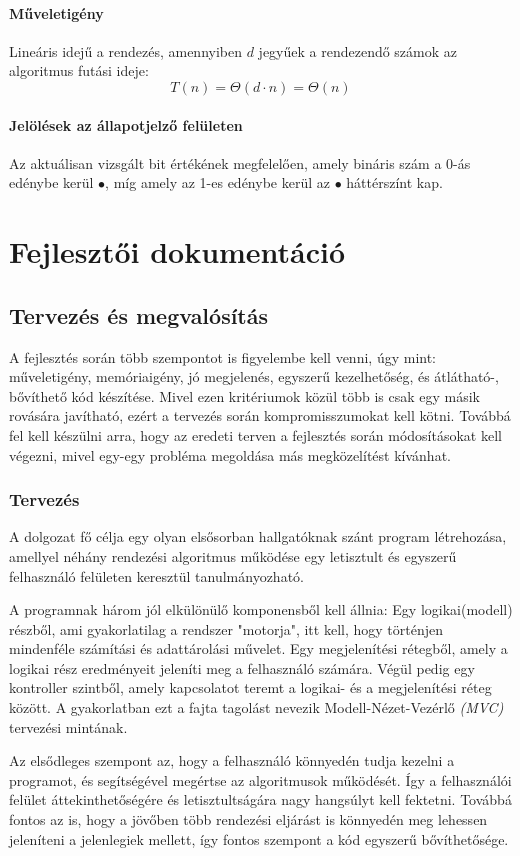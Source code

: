 \documentclass{elteikthesis}
\begin{document}
\subsubsection{Műveletigény}
Lineáris idejű a rendezés, amennyiben $d$ jegyűek a rendezendő számok az algoritmus futási ideje:
$$T(n)=\Theta(d \cdot n) = \Theta(n)$$
\subsubsection{Jelölések az állapotjelző felületen}
Az aktuálisan vizsgált bit értékének megfelelően, amely bináris szám a 0-ás edénybe kerül \textcolor{swap}{\Huge$\bullet$}, míg amely az 1-es edénybe kerül az \textcolor{select}{\Huge$\bullet$} háttérszínt kap.

\chapter{Fejlesztői dokumentáció}

\section{Tervezés és megvalósítás}
A fejlesztés során több szempontot is figyelembe kell venni, úgy mint: műveletigény, memóriaigény, jó megjelenés, egyszerű kezelhetőség, és átlátható-, bővíthető kód készítése. Mivel ezen kritériumok közül több is csak egy másik rovására javítható, ezért a tervezés során kompromisszumokat kell kötni. Továbbá fel kell készülni arra, hogy az eredeti terven a fejlesztés során módosításokat kell végezni, mivel egy-egy probléma megoldása más megközelítést kívánhat.

\subsection{Tervezés}
A dolgozat fő célja egy olyan elsősorban hallgatóknak szánt program létrehozása, amellyel néhány rendezési algoritmus működése egy letisztult és egyszerű felhasználó felületen keresztül tanulmányozható.\par
A programnak három jól elkülönülő komponensből kell állnia:
Egy logikai(modell) részből, ami gyakorlatilag a rendszer "motorja", itt kell, hogy történjen mindenféle számítási és adattárolási művelet. Egy megjelenítési rétegből, amely a logikai rész eredményeit jeleníti meg a felhasználó számára. Végül pedig egy kontroller szintből, amely kapcsolatot teremt a logikai- és a megjelenítési réteg között. A gyakorlatban ezt a fajta tagolást nevezik Modell-Nézet-Vezérlő \emph{(MVC)} tervezési mintának.\par
Az elsődleges szempont az, hogy a felhasználó könnyedén tudja kezelni a programot, és segítségével megértse az algoritmusok működését. Így a felhasználói felület áttekinthetőségére és letisztultságára nagy hangsúlyt kell fektetni. Továbbá fontos az is, hogy a jövőben több rendezési eljárást is könnyedén meg lehessen jeleníteni a jelenlegiek mellett, így fontos szempont a kód egyszerű bővíthetősége.
\end{document}

